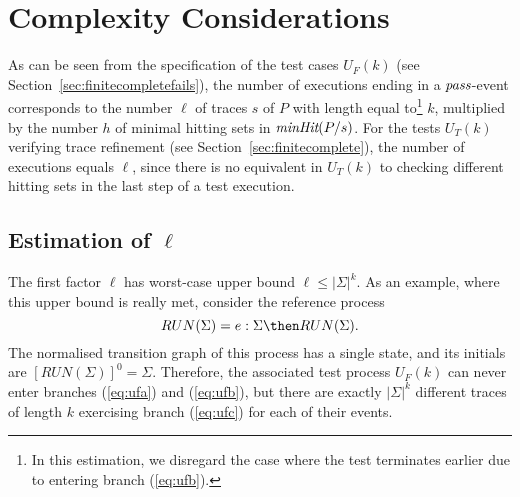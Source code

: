 \section{Complexity Considerations}
\label{sec:complexity}


 
As can be seen from the specification of the test cases $U_F(k)$ 
(see Section~\ref{sec:finitecompletefails}), the number of
executions ending in a ${\text{\it pass}}$-event corresponds to the number $\ell$ of traces $s$
of $P$ with length equal to\footnote{In this estimation, we disregard
the case where the test
terminates earlier due to entering branch (\ref{eq:ufb}).} $k$,
multiplied by the number $h$ of minimal hitting sets in
$\text{\it minHit}(P/s)$. For the tests $U_T(k)$ verifying trace refinement (see Section~\ref{sec:finitecomplete}), the number of executions equals $\ell$, since
there is no equivalent in $U_T(k)$ 
to checking different hitting sets in the last step of a 
test execution.



\subsection{Estimation of $\ell$}
The first factor $\ell$
has worst-case upper bound $\ell\le |\Sigma|^k$. As an example, where this upper bound 
is really met, consider the reference process
\[
RUN(\Sigma) = e:\Sigma \then RUN(\Sigma).
\]
The normalised transition graph of this process has a single state, and its initials
are $[RUN(\Sigma)]^0 = \Sigma$. Therefore, the associated test process $U_F(k)$ can 
never enter branches (\ref{eq:ufa}) and (\ref{eq:ufb}), but there are exactly 
$|\Sigma|^k$ different traces of length $k$ exercising branch (\ref{eq:ufc})
for each of their events.

